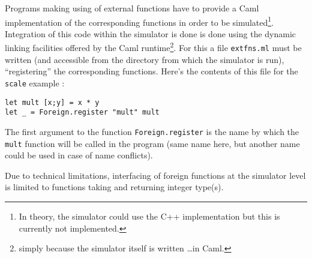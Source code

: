 \medskip
Programs making using of external functions have to provide a Caml implementation of the
corresponding functions in order to be simulated\footnote{In theory, the simulator could use the C++
implementation but this is currently not implemented.}. Integration of this code within the
simulator is done is done using the dynamic linking facilities offered by the Caml runtime\footnote{simply
because the simulator itself is written \ldots in Caml.}. For this a file \texttt{extfns.ml} must be
written (and accessible from the directory from which the simulator is run), ``registering'' the
corresponding functions. Here's the contents of this file for the \texttt{scale} example :

\begin{lstlisting}[language=caml,title=File extfns.ml]
let mult [x;y] = x * y
let _ = Foreign.register "mult" mult
\end{lstlisting}

The first argument to the function \texttt{Foreign.register} is the name by which the \texttt{mult}
function will be called in the \caph program (same name here, but another name could be used in case
of name conflicts).

Due to technical limitations, interfacing of foreign functions at the simulator level is limited to
functions taking and returning integer type(s).


